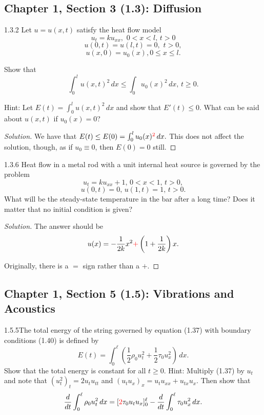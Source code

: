 \documentclass[11pt]{article}
\newenvironment{solution}
  {\renewcommand\qedsymbol{$\blacksquare$}\begin{proof}[Solution]}
  {\end{proof}}
\theoremstyle{definition}
\begin{document}
\subsection{Chapter 1, Section 3 (1.3): Diffusion}
\begin{exercise}{1.3.2}
  Let $u = u(x, t)$ satisfy the heat flow model 
  \[ u_t =ku_{xx}, \, \, 0<x<l, \, t>0 \]
  \[ u(0,t) = u(l,t) = 0, \, \, t > 0,\]
  \[ u(x,0)=u_0(x), 0 \leq x \leq l.\] 
  
  Show that
  \[ \int_0^l u(x, t)^2 \, dx \leq \int_0 u_0(x)^2 \, dx, \, t \geq 0. \]
  
  Hint: Let $E(t) = \int_0^l u(x, t)^2 \, dx$ and show that $E'(t) \leq 0$. What can be said about $u(x, t)$ if $u_0(x) = 0$?
\end{exercise}

\begin{solution}
We have that $E(t) \leq E(0) = \int_0^l u_0(x)^{\textcolor{red}{2}} \, dx.$ This does not affect the solution, though, as if $u_0 \equiv 0$, then $E(0) = 0$ still.

\end{solution}

\begin{exercise}{1.3.6}
Heat flow in a metal rod with a unit internal heat source is governed by the problem
\[u_t=ku_{xx}+1, \, 0<x<1, \, t>0, \]
\[u(0,t)=0, \, u(1,t)=1, \, t>0. \]
What will be the steady-state temperature in the bar after a long time? Does it matter that no initial condition is given?
\end{exercise}

\begin{solution}
  The answer should be \[u(x) = -\frac{1}{2k}x^2 \textcolor{red}{+} \left(1+\frac{1}{2k}\right) x.\]

  Originally, there is a $=$ sign rather than a $+$.
\end{solution}

\setcounter{subsection}{4}
\subsection{Chapter 1, Section 5 (1.5): Vibrations and Acoustics}

\begin{exercise}{1.5.5}The total energy of the string governed by equation (1.37) with boundary conditions (1.40) is defined by \[E(t) = \int_{0}^{\ell} \left( \frac{1}{2} \rho_0 u_t^2 + \frac{1}{2} \tau_0 u_x^2 \right) \, dx.\]
Show that the total energy is constant for all $ t \geq 0$. Hint: Multiply (1.37) by $u_t$ and note that $(u_t^2)_t = 2u_tu_{tt}$ and $(u_tu_x)_x = u_tu_{xx} + u_{tx}u_x.$ Then
show that \[\frac{d}{dt} \int_{0}^{\ell} \rho_0 u_t^2 \, dx= [\textcolor{red}{2}\tau_0u_tu_x]_0^\ell - \frac{d}{dt}  \int_{0}^{\ell} \tau_0 u_x^2 \, dx.\]
\end{exercise}
\end{document}
